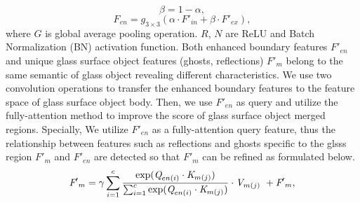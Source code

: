 \documentclass[10pt,twocolumn,letterpaper]{article}
\begin{document}
\begin{equation}
\label{eqn:07}
\beta=1-\alpha,
\end{equation}
\begin{equation}
\label{eqn:07}
{\textit{F}}_{en}={\textit{g}}_{3\times{3}}(\alpha\cdot{\textit{F}}{'}_{in}+\beta\cdot{\textit{F}}{'}_{ex}),
\end{equation}
where ${\textit{G}}$ is global average pooling operation. ${\textit{R}}$, ${\textit{N}}$ are ReLU and Batch Normalization (BN) activation function. 
Both enhanced boundary features ${\textit{F}}{'}_{en}$ and unique glass surface object features (ghosts, reflections) ${\textit{F}}{'}_{m}$ belong to the same semantic of glass object revealing different characteristics. We use two convolution operations to transfer the enhanced boundary features to the feature space of glass surface object body. Then, we use ${\textit{F}}{'}_{en}$ as query and utilize the fully-attention method to improve the score of glass surface object merged regions.
Specially, We utilize ${\textit{F}}{'}_{en}$ as a fully-attention query feature, thus the relationship between features such as reflections and ghosts specific to the glsss region ${\textit{F}}{'}_{m}$ and ${\textit{F}}{'}_{en}$ are detected so that ${\textit{F}}{'}_{m}$ can be refined as formulated below.
\begin{equation}
\label{eqn:03}
{\textit{F}}{'}_{m}=\gamma\sum_{i=1}^{c}\frac{\exp( {\textit{Q}}_{en(i)} \cdot{\textit{K}}_{m(j)}) }{\sum_{i=1}^{c}{\exp( {\textit{Q}}_{en(i)} \cdot{\textit{K}}_{m(j)}) }} \cdot{\textit{V}}_{m(j)} \\\
+{\textit{F}}{'}_{m},
\end{equation}
\end{document}
